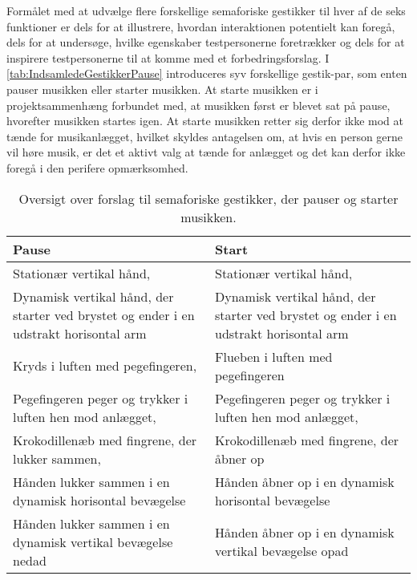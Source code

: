 Formålet med at udvælge flere forskellige semaforiske gestikker til hver af de seks funktioner er dels for at illustrere, hvordan interaktionen potentielt kan foregå, dels for at undersøge, hvilke egenskaber testpersonerne foretrækker og dels for at inspirere testpersonerne til at komme med et forbedringsforslag. \blankline
%
I \autoref{tab:IndsamledeGestikkerPause} introduceres syv forskellige gestik-par, som enten pauser musikken eller starter musikken. At starte musikken er i projektsammenhæng forbundet med, at musikken først er blevet sat på pause, hvorefter musikken startes igen. At starte musikken retter sig derfor ikke mod at tænde for musikanlægget, hvilket skyldes antagelsen om, at hvis en person gerne vil høre musik, er det et aktivt valg at tænde for anlægget og det kan derfor ikke foregå i den perifere opmærksomhed.   
%
\begin{table}[H]
	\centering
	\begin{tabular}{| p{6cm} | p{6cm} | }
		\hline
		\textbf{Pause} & \textbf{Start} \\ \hline
		Stationær vertikal hånd, \parencite[s. 166]{PDF:ComparingInputModalities} & Stationær vertikal hånd, \parencite[s. 166]{PDF:ComparingInputModalities} \\ \hline
		Dynamisk vertikal hånd, der starter ved brystet og ender i en udstrakt horisontal arm  & Dynamisk vertikal hånd, der starter ved brystet og ender i en udstrakt horisontal arm  \\ \hline
		Kryds i luften med pegefingeren, \parencite[s. 48]{PDF:UserDefinedGesturesTV} & Flueben i luften med pegefingeren\\ \hline
		Pegefingeren peger og trykker i luften hen mod anlægget, \parencite{WEB:BeosoundMoment, WEB:Beosound2} & Pegefingeren peger og trykker i luften hen mod anlægget, \parencite[s. 48]{WEB:BeosoundMoment, WEB:Beosound2, PDF:UserDefinedGesturesTV} \\ \hline
		Krokodillenæb med fingrene, der lukker sammen, \parencite[s. 48]{PDF:UserDefinedGesturesTV} & Krokodillenæb med fingrene, der åbner op \\ \hline
		Hånden lukker sammen i en dynamisk horisontal bevægelse & Hånden åbner op i en dynamisk horisontal bevægelse \\ \hline
		Hånden lukker sammen i en dynamisk vertikal bevægelse nedad & Hånden åbner op i en dynamisk vertikal bevægelse opad  \\ \hline
	\end{tabular}
	\caption{Oversigt over forslag til semaforiske gestikker, der pauser og starter musikken.}
	\label{tab:IndsamledeGestikkerPause}
\end{table}
